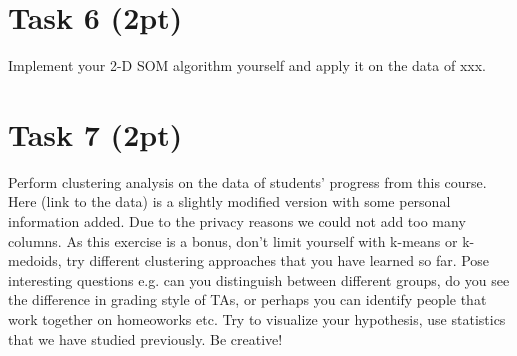 \documentclass{article}
\begin{document}
\section*{Task 6 (2pt)}
Implement your 2-D SOM algorithm yourself and apply it on the data of xxx.

\section*{Task 7 (2pt)}
Perform clustering analysis on the data of students' progress from this course. Here (link to the data) is a slightly modified version with some personal information added. Due to the privacy reasons we could not add too many columns. As this exercise is a bonus, don't limit yourself with k-means or k-medoids, try different clustering approaches that you have learned so far. 
Pose interesting questions e.g. can you distinguish between different groups, do you see the difference in grading style of TAs, or perhaps you can identify people that work together on homeoworks etc. Try to visualize your hypothesis, use statistics that we have studied previously. Be creative!
\end{document}

